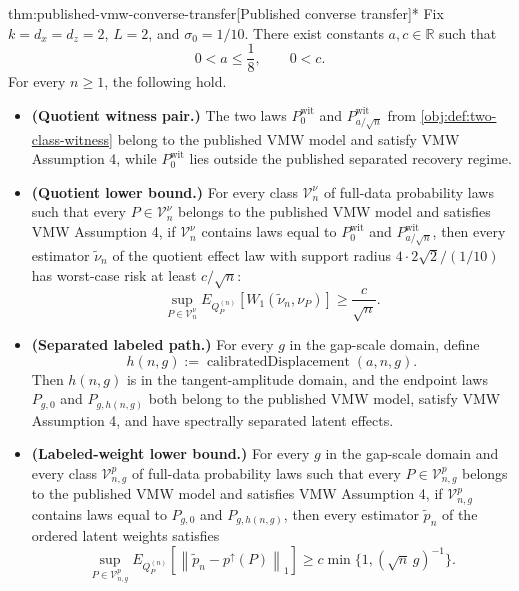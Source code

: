 \documentclass[11pt]{article}
\begin{document}
\begin{theoremv}{thm:published-vmw-converse-transfer}[Published converse transfer]*
Fix \(k=d_x=d_z=2\), \(L=2\), and \(\sigma_0=1/10\).  There exist constants \(a,c\in\mathbb R\) such that
\[
0<a\le \frac18,
\qquad
0<c .
\]
For every \(n\ge 1\), the following hold.
\begin{itemize}
\item \textbf{(Quotient witness pair.)} The two laws \(P_0^{\mathrm{wit}}\) and \(P_{a/\sqrt n}^{\mathrm{wit}}\) from \cref{obj:def:two-class-witness} belong to the published VMW model and satisfy VMW Assumption 4, while \(P_0^{\mathrm{wit}}\) lies outside the published separated recovery regime.
\item \textbf{(Quotient lower bound.)} For every class \(\mathcal V_n^\nu\) of full-data probability laws such that every \(P\in\mathcal V_n^\nu\) belongs to the published VMW model and satisfies VMW Assumption 4, if \(\mathcal V_n^\nu\) contains laws equal to \(P_0^{\mathrm{wit}}\) and \(P_{a/\sqrt n}^{\mathrm{wit}}\), then every estimator \(\widetilde\nu_n\) of the quotient effect law with support radius \(4\cdot 2\sqrt2/(1/10)\) has worst-case risk at least \(c/\sqrt n\):
\[
\sup_{P\in\mathcal V_n^\nu}
E_{Q_P^{(n)}}\!\left[
W_1\!\left(\widetilde\nu_n,\nu_P\right)
\right]
\ge \frac{c}{\sqrt n}.
\]
\item \textbf{(Separated labeled path.)} For every \(g\) in the gap-scale domain, define
\[
h(n,g):=\operatorname{calibratedDisplacement}(a,n,g).
\]
Then \(h(n,g)\) is in the tangent-amplitude domain, and the endpoint laws \(P_{g,0}\) and \(P_{g,h(n,g)}\) both belong to the published VMW model, satisfy VMW Assumption 4, and have spectrally separated latent effects.
\item \textbf{(Labeled-weight lower bound.)} For every \(g\) in the gap-scale domain and every class \(\mathcal V_{n,g}^p\) of full-data probability laws such that every \(P\in\mathcal V_{n,g}^p\) belongs to the published VMW model and satisfies VMW Assumption 4, if \(\mathcal V_{n,g}^p\) contains laws equal to \(P_{g,0}\) and \(P_{g,h(n,g)}\), then every estimator \(\widetilde p_n\) of the ordered latent weights satisfies
\[
\sup_{P\in\mathcal V_{n,g}^p}
E_{Q_P^{(n)}}\!\left[
\left\|\widetilde p_n-p^{\uparrow}(P)\right\|_1
\right]
\ge
c\min\{1,(\sqrt n\,g)^{-1}\}.
\]
\end{itemize}
\end{theoremv}
\end{document}
